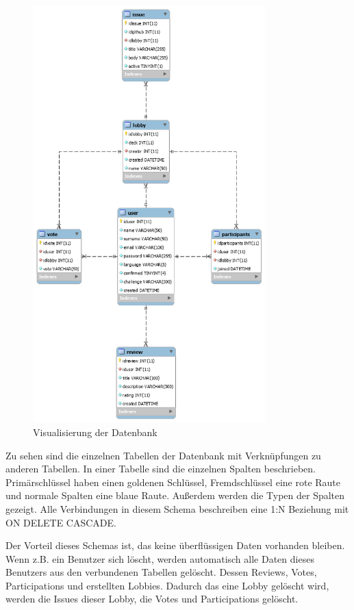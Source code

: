 \begin{figure}[H]
	\centering
  \includegraphics[width=0.8\textwidth]{images/database.png}
	\caption{Visualisierung der Datenbank}
	\label{datenbank}
\end{figure}

Zu sehen sind die einzelnen Tabellen der Datenbank mit Verknüpfungen zu anderen Tabellen. In einer Tabelle sind die einzelnen Spalten beschrieben. Primärschlüssel haben einen goldenen Schlüssel, Fremdschlüssel eine rote Raute und normale Spalten eine blaue Raute. Außerdem werden die Typen der Spalten gezeigt. Alle Verbindungen in diesem Schema beschreiben eine 1:N Beziehung mit ON DELETE CASCADE.

Der Vorteil dieses Schemas ist, das keine überflüssigen Daten vorhanden bleiben. Wenn z.B. ein Benutzer sich löscht, werden automatisch alle Daten dieses Benutzers aus den verbundenen Tabellen gelöscht. Dessen Reviews, Votes, Participations und erstellten Lobbies. Dadurch das eine Lobby gelöscht wird, werden die Issues dieser Lobby, die Votes und Participations gelöscht.